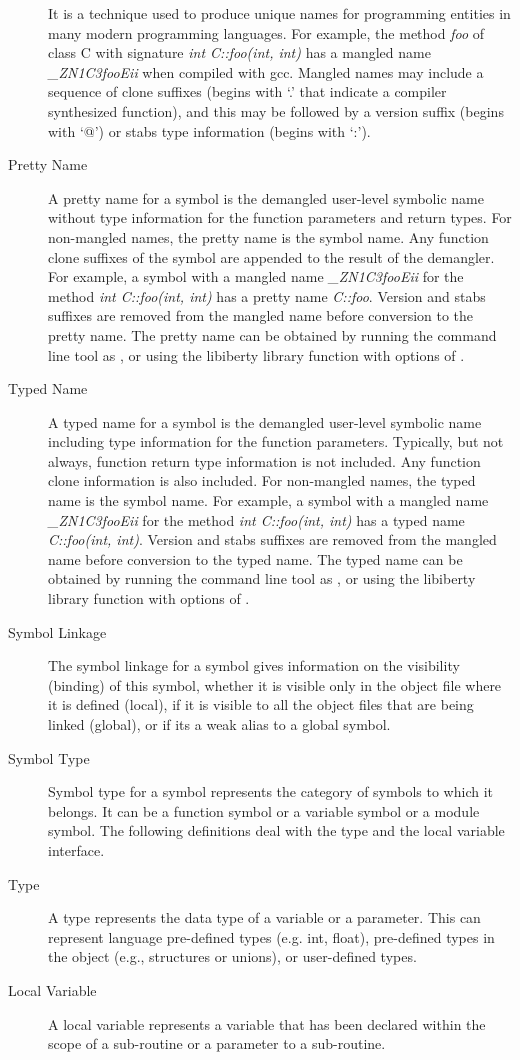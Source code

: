 \begin{description}
It is a technique used to produce unique names for programming entities in many modern programming languages.
For example, the method \emph{foo} of class C with signature \emph{int C::foo(int, int)} has a mangled name \emph{\_ZN1C3fooEii} when compiled with gcc.
Mangled names may include a sequence of clone suffixes (begins with `.' that indicate a compiler synthesized function), and this may be followed by a version suffix (begins with `@') or stabs type information (begins with `:').
\item[Pretty Name] A pretty name for a symbol is the demangled user-level symbolic name without type information for the function parameters and return types.
For non-mangled names, the pretty name is the symbol name.
Any function clone suffixes of the symbol are appended to the result of the demangler.
For example, a symbol with a mangled name \emph{\_ZN1C3fooEii} for the method \emph{int C::foo(int, int)} has a pretty name \emph{C::foo}.
Version and stabs suffixes are removed from the mangled name before conversion to the pretty name.
The pretty name can be obtained by running the command line tool  as , or using the libiberty library function  with options of .
\item[Typed Name] A typed name for a symbol is the demangled user-level symbolic name including type information for the function parameters.
Typically, but not always, function return type information is not included. Any function clone information is also included.
For non-mangled names, the typed name is the symbol name.
For example, a symbol with a mangled name \emph{\_ZN1C3fooEii} for the method \emph{int C::foo(int, int)} has a typed name \emph{C::foo(int, int)}.
Version and stabs suffixes are removed from the mangled name before conversion to the typed name.
The typed name can be obtained by running the command line tool  as , or using the libiberty library function  with options of .
\item[Symbol Linkage] The symbol linkage for a symbol gives information on the visibility (binding) of this symbol, whether it is visible only in the object file where it is defined (local), if it is visible to all the object files that are being linked (global), or if its a weak alias to a global symbol.
\item[Symbol Type] Symbol type for a symbol represents the category of symbols to which it belongs. It can be a function symbol or a variable symbol or a module symbol.
The following definitions deal with the type and the local variable interface.
\item[Type] A type represents the data type of a variable or a parameter. This can represent language pre-defined types (e.g. int, float), pre-defined types in the object (e.g., structures or unions), or user-defined types.
\item[Local Variable] A local variable represents a variable that has been declared within the scope of a sub-routine or a parameter to a sub-routine.
\end{description}


